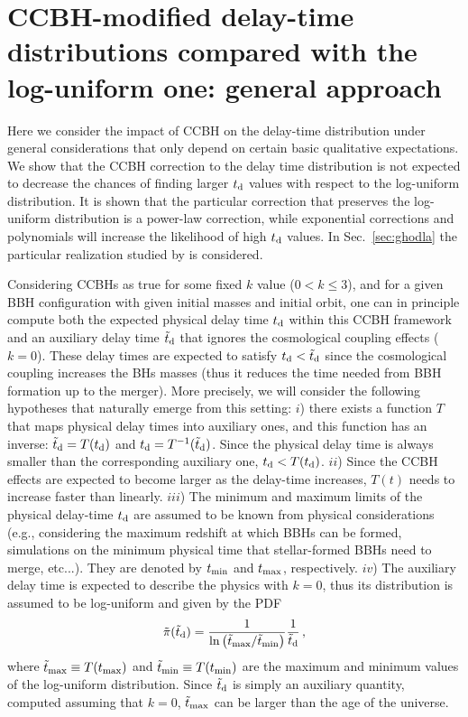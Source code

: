 \documentclass[fleqn,usenatbib,useAMS]{mnras}
\begin{document}
\section{CCBH-modified delay-time distributions compared with the log-uniform one: general approach} \label{app:CCBHtdGeneral}

Here we consider the impact of CCBH on the delay-time distribution under general considerations that  only depend on certain basic qualitative expectations. We show that the CCBH correction to the delay time distribution is not expected to decrease the chances of finding larger $t_{\rm d}$ values with respect to the log-uniform distribution.  It is shown that the particular correction that preserves the log-uniform distribution is a power-law correction, while exponential corrections and polynomials will increase the likelihood of high $t_{\rm d}$ values. In  Sec.~\ref{sec:ghodla} the particular realization studied by \cite{Ghodla:2023iaz} is considered.

Considering CCBHs as true for some fixed $k$ value ($0 < k \leq 3$), and for a given  BBH configuration with given initial masses and initial orbit, one can in principle compute both the expected physical delay time $t_{\rm d}$ within this CCBH framework and an auxiliary delay time $\tilde{t}_{\rm d}$ that ignores the cosmological coupling effects ($k=0$). These delay times are expected to satisfy ${t}_{\rm d} < \tilde{t}_{\rm d}$ since the cosmological coupling increases the BHs masses (thus it reduces the time needed from BBH formation up to the merger). More precisely, we will consider the following hypotheses that naturally emerge from this setting: $i$) there exists a function $T$ that maps physical delay times into auxiliary ones, and this function has an inverse: $ \tilde t_{\rm d} = T(t_{\rm d})$ and $t_{\rm d} = T^{-1}(\tilde t_{\rm d})$. Since the physical delay time is always smaller than the corresponding auxiliary one, $t_{\rm d} < T(t_{\rm d})$. $ii$) Since the CCBH effects are expected to become larger as the delay-time increases, $T(t)$ needs to increase faster than linearly. $iii$) The minimum and maximum limits of the physical delay-time $t_{\rm d}$ are assumed to be known from physical considerations (e.g., considering the maximum redshift at which BBHs can be formed, simulations on the minimum physical time that stellar-formed BBHs need to merge, etc...). They are denoted by $t_{\rm min}$ and $t_{\rm max}$, respectively.  $iv$) The auxiliary delay time is expected to describe the physics with $k=0$, thus its distribution is assumed to be log-uniform and given by the PDF
\begin{equation} \label{tildetPDF}
  \tilde \pi(\tilde t_{\rm d}) = \frac{1}{\ln \left( {\tilde t_{\rm max}}/{\tilde t_{\rm min}}\right) } \frac{1}{\tilde t_{\rm d}} \, ,
\end{equation}
where $\tilde t_{\rm max} \equiv T(t_{\rm max})$ and $\tilde t_{\rm min}\equiv T(t_{\rm min})$ are the maximum and minimum values of the log-uniform distribution. Since $\tilde t_{\rm d}$ is simply an auxiliary quantity, computed assuming that $k=0$, $\tilde t_{\rm max}$ can be larger than the age of the universe. 
\end{document}

